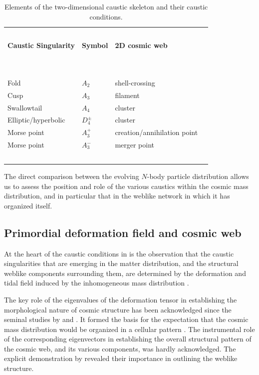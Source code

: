 \documentclass[a4paper, 11pt]{article}
\begin{document}
\begin{table}
\centering
{\scriptsize
\begin{tabular}{ |l | l | l | l |}
  \hline
  \ && \\
\textbf{Caustic Singularity} & \textbf{Symbol} & \textbf{2D cosmic web}\\
\ && \\
\hline
\ && \\
Fold & $A_2$ & shell-crossing \\
Cusp & $A_3$ & filament \\
Swallowtail &$A_4$ &  cluster\\
Elliptic/hyperbolic & $D_4^{\pm}$ & cluster\\
Morse point & $A_3^+$ & creation/annihilation point\\
Morse point & $A_3^-$ & merger point\\
\ && \\
\hline
\end{tabular}
}
\caption{Elements of the two-dimensional caustic skeleton and their caustic conditions.}
\label{table:caustics-cosmciweb}
\end{table}

The direct comparison between the evolving $N$-body particle distribution allows us to assess the position and role of the various caustics within the cosmic mass distribution, and in particular that in the weblike network in which it has organized itself.

\subsection{Primordial deformation field and cosmic web}
At the heart of the caustic conditions in \cite{Feldbrugge:2018} is the observation that the caustic singularities that are emerging in the matter distribution, and the structural weblike components surrounding them, are determined by the deformation and tidal field induced by the inhomogeneous mass distribution \cite{Zeldovich:1970,Weygaert:1996,Weygaert:2008,Hidding:2014}.

The key role of the eigenvalues of the deformation tensor in establishing the morphological nature of cosmic structure has been acknowledged since the seminal studies by \cite{Zeldovich:1970} and \cite{Doroshkevich:1970}. It formed the basis for the expectation that the cosmic mass distribution would be organized in a cellular pattern \cite[also see][]{Shandarin:1989,Shandarin:2009}. The instrumental role of the corresponding eigenvectors in establishing the overall structural pattern of the cosmic web, and its various components, was hardly acknowledged. The explicit demonstration by \cite{Feldbrugge:2018} revealed their importance in outlining the weblike structure.
\end{document}

